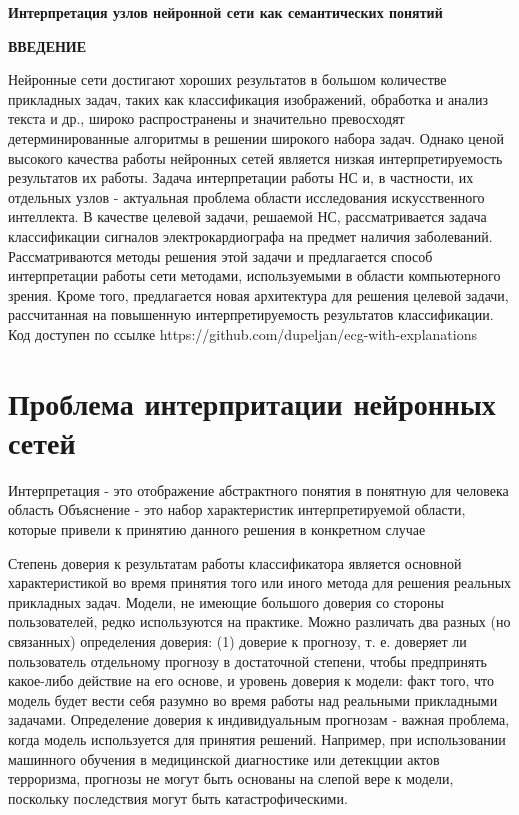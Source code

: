 \documentclass[oneside,final,14pt]{extreport}
\begin{document}
\tableofcontents
\newpage
\begin{center}
\bfseries Интерпретация узлов нейронной сети как семантических понятий
\end{center}
\newpage
\begin{center}
\bfseries ВВЕДЕНИЕ
\end{center}
Нейронные сети достигают хороших результатов в большом количестве прикладных задач, таких как классификация изображений, обработка и анализ текста и др., широко распространены и значительно превосходят детерминированные алгоритмы в решении широкого набора задач. Однако ценой высокого качества работы нейронных сетей является низкая интерпретируемость результатов их работы. Задача интерпретации работы НС и, в частности, их отдельных узлов - актуальная проблема области исследования искусственного интеллекта. В качестве целевой задачи, решаемой НС, рассматривается задача классификации сигналов электрокардиографа на предмет наличия заболеваний. Рассматриваются методы решения этой задачи и предлагается способ интерпретации работы сети методами, используемыми в области компьютерного зрения. Кроме того, предлагается новая архитектура для решения целевой задачи, рассчитанная на повышенную интерпретируемость результатов классификации. Код доступен по ссылке https://github.com/dupeljan/ecg-with-explanations

\chapter{Проблема интерпритации нейронных сетей}

Интерпретация - это отображение абстрактного понятия в понятную для человека область
Объяснение - это набор характеристик интерпретируемой области, которые привели к принятию данного решения в конкретном случае \cite{bib:Montavon} 

Степень доверия к результатам работы классификатора является основной характеристикой во время принятия того или иного метода для решения реальных прикладных задач. Модели, не имеющие большого доверия со стороны пользователей, редко используются на практике. Можно различать два разных (но связанных) определения доверия: (1) доверие к прогнозу, т. е. доверяет ли пользователь отдельному прогнозу в достаточной степени, чтобы предпринять какое-либо действие на его основе, и уровень доверия к модели: факт того, что модель будет вести себя разумно во время работы над реальными прикладными задачами. Определение доверия к индивидуальным прогнозам - важная проблема, когда модель используется для принятия решений. Например, при использовании машинного обучения в медицинской диагностике или детекцции актов терроризма, прогнозы не могут быть основаны на слепой вере к модели, поскольку последствия могут быть катастрофическими.
\end{document}
